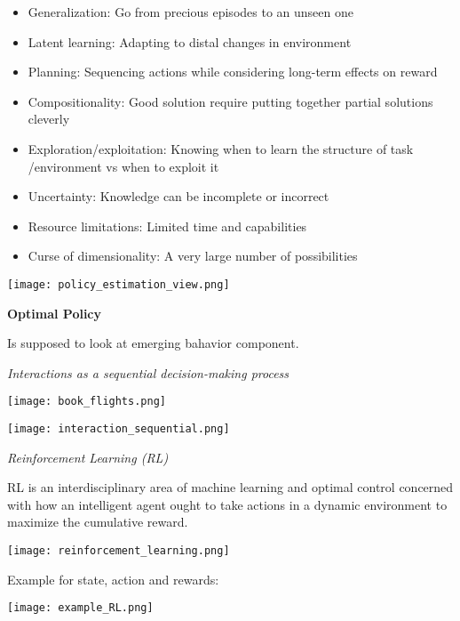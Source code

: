\begin{itemize}[itemsep=-5pt, topsep=0pt, leftmargin=*]
	\item Generalization: Go from precious episodes to an unseen one
	\item Latent learning: Adapting to distal changes in environment
	\item Planning: Sequencing actions while considering long-term effects on reward
	\item Compositionality: Good solution require putting together partial solutions cleverly
	\item Exploration/exploitation: Knowing when to learn the structure of task /environment vs when to exploit it
	\item Uncertainty: Knowledge can be incomplete or incorrect
	\item Resource limitations: Limited time and capabilities
	\item Curse of dimensionality: A very large number of possibilities
\end{itemize}

\begin{center}
	\texttt{[image: policy\_estimation\_view.png]}
\end{center}


\textbf{Optimal Policy}

Is supposed to look at emerging bahavior component. \medskip

\textit{Interactions as a sequential decision-making process} \smallskip

\begin{center}
	\texttt{[image: book\_flights.png]}
\end{center}

\begin{center}
	\texttt{[image: interaction\_sequential.png]}
\end{center}


\textit{Reinforcement Learning (RL)} \smallskip

RL is an interdisciplinary area of machine learning and optimal control concerned with how an intelligent agent ought to take actions in a dynamic environment to maximize the cumulative reward. 

\begin{center}
	\texttt{[image: reinforcement\_learning.png]}
\end{center}

Example for state, action and rewards: 
\begin{center}
	\texttt{[image: example\_RL.png]}
\end{center}

